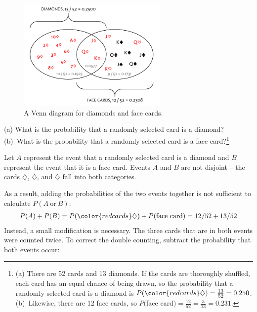 \begin{figure}[h]
	\centering
	\includegraphics[width=0.65\textwidth]{ch_probability_oi_biostat/figures/cardsDiamondFaceVenn/cardsDiamondFaceVenn.png}
	\caption{A Venn diagram for diamonds and face cards.}
	\label{fig:cardsDiamondFaceVenn}
\end{figure}


\begin{exercise}
	(a) What is the probability that a randomly selected card is a diamond? (b)~What is the probability that a randomly selected card is a face card?\footnote{(a) There are 52 cards and 13 diamonds. If the cards are thoroughly shuffled, each card has an equal chance of being drawn, so the probability that a randomly selected card is a diamond is $P({\color{redcards}\diamondsuit}) = \frac{13}{52} = 0.250$. (b)~Likewise, there are 12 face cards, so $P($face card$) = \frac{12}{52} = \frac{3}{13} = 0.231$.}
\end{exercise}

Let $A$ represent the event that a randomly selected card is a diamond and $B$ represent the event that it is a face card. Events $A$ and $B$ are not disjoint -- the cards {\color{redcards}$\diamondsuit$}, {\color{redcards}$\diamondsuit$}, and {\color{redcards}$\diamondsuit$} fall into both categories. 

As a result, adding the probabilities of the two events together is not sufficient to calculate $P(A \ \text{or} \ B)$:
\begin{eqnarray*}
	P(A) + P(B) = P({\color{redcards}\diamondsuit}) + P(\text{face card}) = 12/52 + 13/52
	\label{overCountFaceDiamond}
\end{eqnarray*}
Instead, a small modification is necessary. The three cards that are in both events were counted twice. To correct the double counting, subtract the probability that both events occur:

